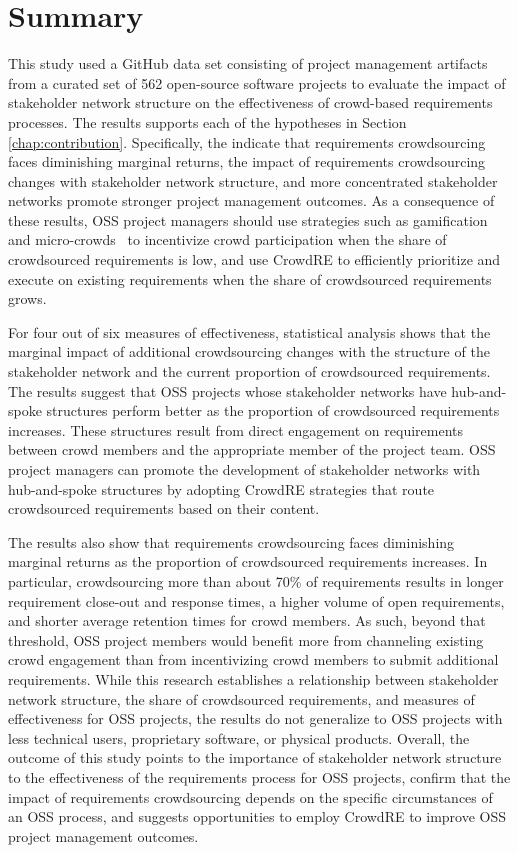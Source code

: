 \section{Summary}

This study used a GitHub data set consisting of project management artifacts from a curated set of 562 open-source software projects to evaluate the impact of stakeholder network structure on the effectiveness of crowd-based requirements processes. The results supports each of the hypotheses in Section \ref{chap:contribution}. Specifically, the indicate that requirements crowdsourcing faces diminishing marginal returns, the impact of requirements crowdsourcing changes with stakeholder network structure, and more concentrated stakeholder networks promote stronger project management outcomes. As a consequence of these results, OSS project managers should use strategies such as gamification~\cite{dalpiaz} and micro-crowds~\cite{levy} to incentivize crowd participation when the share of crowdsourced requirements is low, and use CrowdRE to efficiently prioritize and execute on existing requirements when the share of crowdsourced requirements grows.

For four out of six measures of effectiveness, statistical analysis shows that the marginal impact of additional crowdsourcing changes with the structure of the stakeholder network and the current proportion of crowdsourced requirements. The results suggest that OSS projects whose stakeholder networks have hub-and-spoke structures perform better as the proportion of crowdsourced requirements increases. These structures result from direct engagement on requirements between crowd members and the appropriate member of the project team. OSS project managers can promote the development of stakeholder networks with hub-and-spoke structures by adopting CrowdRE strategies that route crowdsourced requirements based on their content.

The results also show that requirements crowdsourcing faces diminishing marginal returns as the proportion of crowdsourced requirements increases. In particular, crowdsourcing more than about 70\% of requirements results in longer requirement close-out and response times, a higher volume of open requirements, and shorter average retention times for crowd members. As such, beyond that threshold, OSS project members would benefit more from channeling existing crowd engagement than from incentivizing crowd members to submit additional requirements. While this research establishes a relationship between stakeholder network structure, the share of crowdsourced requirements, and measures of effectiveness for OSS projects, the results do not generalize to OSS projects with less technical users, proprietary software, or physical products. Overall, the outcome of this study points to the importance of stakeholder network structure to the effectiveness of the requirements process for OSS projects, confirm that the impact of requirements crowdsourcing depends on the specific circumstances of an OSS process, and suggests opportunities to employ CrowdRE to improve OSS project management outcomes.